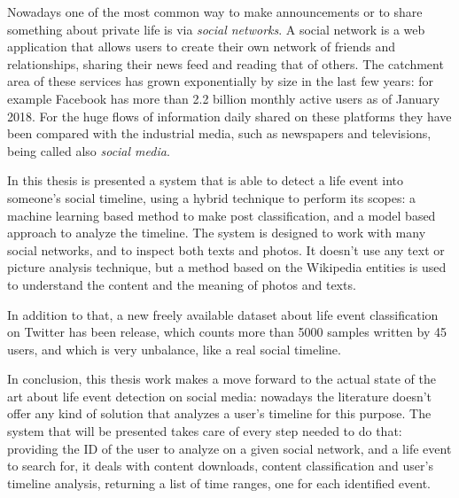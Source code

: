 Nowadays one of the most common way to make announcements or to share something about private life is via \emph{social networks}. A social network is a web application that allows users to create their own network of friends and relationships, sharing their news feed and reading that of others. The 
catchment area of these services has grown exponentially by size in the last few years: for example Facebook has more than 2.2 billion monthly active users as of January 2018. For the huge flows of information daily shared on these platforms they have been compared with the industrial media, such as newspapers and televisions, being called also \emph{social media}.

In this thesis is presented a system that is able to detect a life event into someone's social timeline, using a hybrid technique to perform its scopes: a machine learning based method to make post classification, and a model based approach to analyze the timeline. The system is designed to work with many social networks, and to inspect both texts and photos. It doesn't use any text or picture analysis technique, but a method based on the Wikipedia entities is used to understand the content and the meaning of photos and texts.

In addition to that, a new freely available dataset about life event classification on Twitter has been release, which counts more than 5000 samples written by 45 users, and which is very unbalance, like a real social timeline.

In conclusion, this thesis work makes a move forward to the actual state of the art about life event detection on social media: nowadays the literature doesn't offer any kind of solution that analyzes a user's timeline for this purpose. The system that will be presented takes care of every step needed to do that: providing the ID of the user to analyze on a given social network, and a life event to search for, it deals with content downloads, content classification and user's timeline analysis, returning a list of time ranges, one for each identified event.

